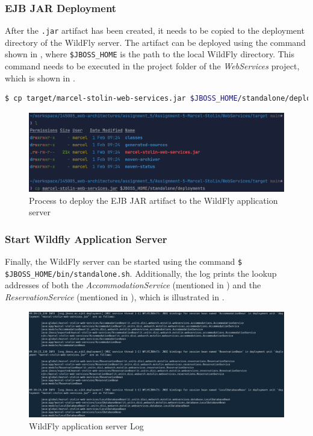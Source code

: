 \subsubsection{EJB JAR Deployment}\label{sec:03_depl_wildfly_deploy}
After the \texttt{.jar} artifact has been created, it needs to be copied to the deployment directory of the WildFly server. The artifact can be deployed using the command shown in , where \texttt{\$JBOSS\_HOME} is the path to the local WildFly directory. This command needs to be executed in the project folder of the \textit{WebServices} project, which is shown in .
\begin{lstlisting}[label=lst:03_depl_wildfly_deploy_command, caption=Command to copy the EJB JAR artifact to the WildFly deployment directory, language=bash]
$ cp target/marcel-stolin-web-services.jar $JBOSS_HOME/standalone/deployments
\end{lstlisting}
\begin{figure}[h]
\centering
\includegraphics[scale=0.2]{images/03_depl/web-services-deployment}
\caption{Process to deploy the EJB JAR artifact to the WildFly application server}
\label{fig:03_depl_wildfly_deploy_command}
\end{figure}


\subsubsection{Start Wildfly Application Server}\label{sec:03_depl_wildfly_start}
Finally, the WildFly server can be started using the command \linebreak \texttt{\$ \$JBOSS\_HOME/bin/standalone.sh}. Additionally, the log prints the lookup addresses of both the \textit{AccommodationService} (mentioned in ) and the \textit{ReservationService} (mentioned in ), which is illustrated in .
\begin{figure}[h]
\centering
\includegraphics[scale=0.13]{images/03_depl/deployed-beans}
\caption{WildFly application server Log}
\label{fig:03_depl_wildfly_start_addresses}
\end{figure}


